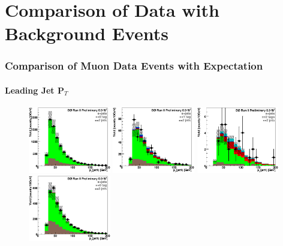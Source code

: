 \chapter{Comparison of Data with Background Events}
\label{databackgroundapp}

\subsection{Comparison of Muon Data Events with Expectation}

\subsubsection{Leading Jet P$_{T}$}

\begin{figure}[!h!tbp]
\begin{center}
\includegraphics[width=0.32\textwidth]{eps/DataBackground/electron/CC_EqZeroTag_EqTwoJet_Jet1Pt.eps}
\includegraphics[width=0.32\textwidth]{eps/DataBackground/electron/CC_EqOneTag_EqTwoJet_Jet1Pt.eps}
\includegraphics[width=0.32\textwidth]{eps/DataBackground/electron/CC_EqTwoTag_EqTwoJet_Jet1Pt.eps}
\includegraphics[width=0.32\textwidth]{eps/DataBackground/electron/CC_EqZeroTag_EqThreeJet_Jet1Pt.eps}

\end{center}
\end{figure}
